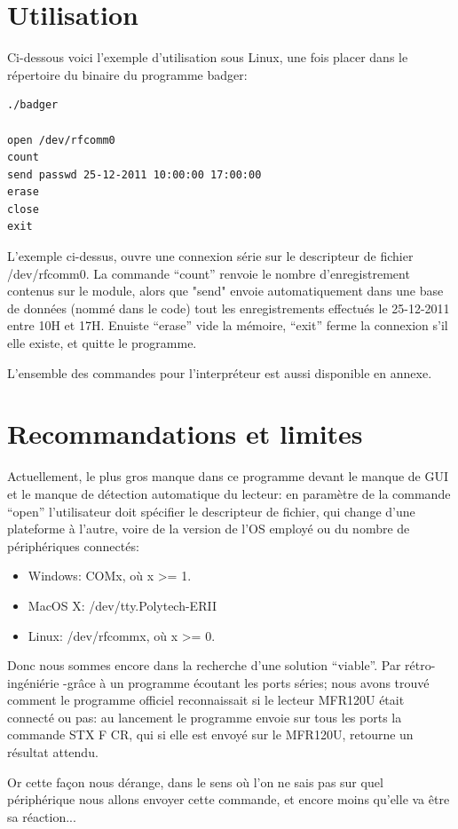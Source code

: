 \section{Utilisation}
    Ci-dessous voici l'exemple d'utilisation sous Linux, une fois placer dans le
répertoire du binaire du programme badger:

    \begin{lstlisting}
./badger

open /dev/rfcomm0
count
send passwd 25-12-2011 10:00:00 17:00:00
erase
close
exit
    \end{lstlisting}

    L'exemple ci-dessus, ouvre une connexion série sur le descripteur de fichier
/dev/rfcomm0. La commande ``count'' renvoie le nombre d'enregistrement contenus sur 
le module, alors que "send" envoie automatiquement dans une base de données (nommé
dans le code) tout les enregistrements effectués le 25-12-2011 entre 10H et 17H.
Enuiste ``erase'' vide la mémoire, ``exit'' ferme la connexion s'il elle existe, et
quitte le programme.

    L'ensemble des commandes pour l'interpréteur est aussi disponible en annexe.




\section{Recommandations et limites}
    Actuellement, le plus gros manque dans ce programme devant le manque de GUI et
le manque de détection automatique du lecteur: en paramètre de la commande ``open''
l'utilisateur doit spécifier le descripteur de fichier, qui change d'une plateforme
à l'autre, voire de la version de l'OS employé ou du nombre de périphériques connectés:

    \begin{itemize}
        \item Windows: COMx, où x >= 1.
        \item MacOS X: /dev/tty.Polytech-ERII
        \item Linux: /dev/rfcommx, où x >= 0.
    \end{itemize}

    Donc nous sommes encore dans la recherche d'une solution ``viable''. Par
rétro-ingéniérie -grâce à un programme écoutant les ports séries; nous avons
trouvé comment le programme officiel reconnaissait si le lecteur MFR120U était 
connecté ou pas: au lancement le programme envoie sur tous les ports la commande
STX F CR, qui si elle est envoyé sur le MFR120U, retourne un résultat attendu.

    Or cette façon nous dérange, dans le sens où l'on ne sais pas sur quel périphérique
nous allons envoyer cette commande, et encore moins qu'elle va être sa réaction...

